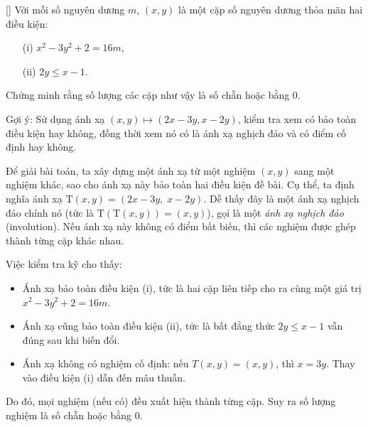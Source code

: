 \documentclass[../04-diophantine-equations.tex]{subfiles}
\begin{document}
\begin{example*}\label{example:KOR-2015-MO-P1}[\textbf{}]
	Với mỗi số nguyên dương \( m \), \( (x, y) \) là một cặp số nguyên dương thỏa mãn hai điều kiện:
	\begin{enumerate}[topsep=0pt, partopsep=0pt, itemsep=0pt]
		\item[(i)] \( x^2 - 3y^2 + 2 = 16m \),
		\item[(ii)] \( 2y \le x - 1 \).
	\end{enumerate}
	Chứng minh rằng số lượng các cặp như vậy là số chẵn hoặc bằng 0.
\end{example*}

\begin{remark*}
	Gợi ý: Sử dụng ánh xạ \( (x, y) \mapsto (2x - 3y, x - 2y) \), kiểm tra xem có bảo toàn điều kiện hay không, đồng thời xem nó có là ánh xạ nghịch đảo và có điểm cố định hay không.
\end{remark*}

\begin{story*}
    Để giải bài toán, ta xây dựng một ánh xạ từ một nghiệm \( (x, y) \) sang một nghiệm khác, sao cho ánh xạ này bảo toàn hai điều kiện đề bài.  
    Cụ thể, ta định nghĩa ánh xạ \( \mathrm{T}(x, y) = (2x - 3y,\; x - 2y) \).  
    Dễ thấy đây là một ánh xạ nghịch đảo chính nó (tức là \( \mathrm{T}(\mathrm{T}(x, y)) = (x, y) \)), gọi là một \textit{ánh xạ nghịch đảo} (involution).  
    Nếu ánh xạ này không có điểm bất biến, thì các nghiệm được ghép thành từng cặp khác nhau.

    Việc kiểm tra kỹ cho thấy:
    \begin{itemize}[topsep=0pt, partopsep=0pt, itemsep=0pt]
        \item Ánh xạ bảo toàn điều kiện (i), tức là hai cặp liên tiếp cho ra cùng một giá trị \( x^2 - 3y^2 + 2 = 16m \).
        \item Ánh xạ cũng bảo toàn điều kiện (ii), tức là bất đẳng thức \( 2y \le x - 1 \) vẫn đúng sau khi biến đổi.
        \item Ánh xạ không có nghiệm cố định: nếu \( T(x, y) = (x, y) \), thì \( x = 3y \). Thay vào điều kiện (i) dẫn đến mâu thuẫn.
    \end{itemize}

    Do đó, mọi nghiệm (nếu có) đều xuất hiện thành từng cặp. Suy ra số lượng nghiệm là số chẵn hoặc bằng 0.
\end{story*}

\bigbreak
\end{document}
